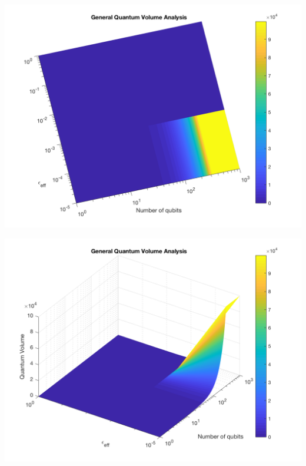 \documentclass[11pt]{article}
\begin{document}
\begin{minipage}{.45\textwidth}

\centering

\begin{center}
\includegraphics[width=.9\linewidth]{general_QV2.png}
\end{center}

\label{fig:deviceQV2}

\end{minipage}%
\hspace{1cm}
\begin{minipage}{.45\textwidth}

\begin{center}
\includegraphics[width=.9\linewidth]{general_QV1.png}
\end{center}

\label{fig:deviceQV1}

\end{minipage}%
\end{document}
